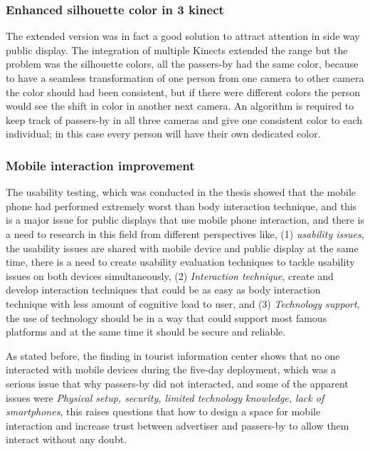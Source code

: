 \subsubsection{Enhanced silhouette color in 3 kinect}
The extended version was in fact a good solution to attract attention in side way public display. The integration of multiple Kinects extended the range but the problem was the silhouette colors, all the passers-by had the same color, because to have a seamless transformation of one person from one camera to other camera the color should had been consistent, but if there were different colors the person would see the shift in color in another next camera. An algorithm is required to keep track of passers-by in all three cameras and give one consistent color to each individual; in this case every person will have their own dedicated color.

\subsubsection{Mobile interaction improvement}
The usability testing, which was conducted in the thesis showed that the mobile phone had performed extremely worst than body interaction technique, and this is a major issue for public displays that use mobile phone interaction, and there is a need to research in this field from different perspectives like, (1) \emph{usability issues}, the usability issues are shared with mobile device and public display at the same time, there is a need to create usability evaluation techniques to tackle usability issues on both devices simultaneously, (2) \emph{Interaction technique}, create and develop interaction techniques that could be as easy as body interaction technique with less amount of cognitive load to user, and (3) \emph{Technology support}, the use of technology should be in a way that could support most famous platforms and at the same time it should be secure and reliable. 

As stated before, the finding in tourist information center shows that no one interacted with mobile devices during the five-day deployment, which was a serious issue that why passers-by did not interacted, and some of the apparent issues were \emph{Physical setup, security, limited technology knowledge, lack of smartphones}, this raises questions that how to design a space for mobile interaction and increase trust between advertiser and passers-by to allow them interact without any doubt. 




